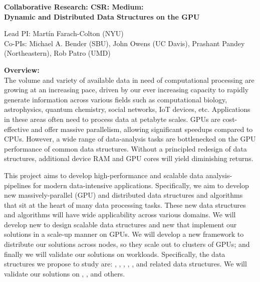 
\begin{center}

\bf
\Large
Collaborative Research: CSR: Medium: \\Dynamic and Distributed Data Structures on the GPU

\small
Lead PI: Mart\'{i}n Farach-Colton (NYU) \\
Co-PIs: Michael A. Bender (SBU), John Owens (UC Davis), Prashant Pandey (Northeastern), Rob Patro (UMD)
\end{center}

\vspace{-0.3cm}

\noindent \textbf{\large Overview:}\\
The volume and variety of available data in need of computational processing are growing at an increasing pace, driven by our ever increasing capacity to rapidly generate information across various fields such as  computational biology, astrophysics, quantum chemistry, social networks, IoT devices, etc. Applications in these areas often need to process data at petabyte scales. 
GPUs are cost-effective and offer massive parallelism, allowing significant speedups compared to CPUs. 
However, a wide range of data-analysis tasks are bottlenecked on the GPU performance of common data structures.  Without a principled redesign of data structures, additional device RAM and GPU cores will yield diminishing returns.

This project aims to develop high-performance and scalable data analysis-pipelines for modern data-intensive applications. Specifically, we aim to develop new massively-parallel (GPU) and distributed data structures and algorithms that sit at the heart of many data processing tasks. These new data structures and algorithms will have wide applicability across various domains.
%
We will develop new  to design scalable data structures and new  that implement our solutions in a scale-up manner on GPUs. We will develop a new framework to distribute our solutions across nodes, so they scale out to clusters of GPUs; and finally we will validate our solutions on  workloads.
%
Specifically, the data structures we propose to study are: , , , , , and related data structures. We will validate our solutions on , ,  and others.

